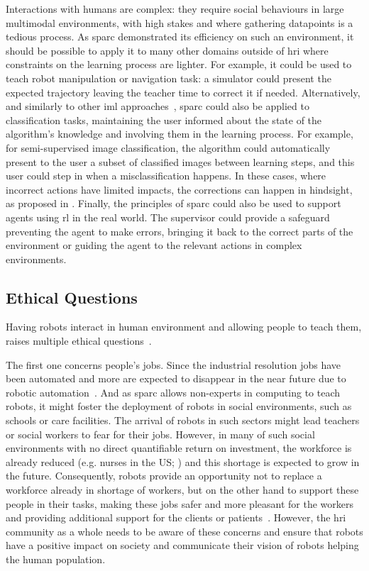 Interactions with humans are complex: they require social behaviours in large multimodal environments, with high stakes and where gathering datapoints is a tedious process. As \gls{sparc} demonstrated its efficiency on such an environment, it should be possible to apply it to many other domains outside of \gls{hri} where constraints on the learning process are lighter. For example, it could be used to teach robot manipulation or navigation task: a simulator could present the expected trajectory leaving the teacher time to correct it if needed. Alternatively, and similarly to other \gls{iml} approaches~\citep{fails2003interactive}, \gls{sparc} could also be applied to classification tasks, maintaining the user informed about the state of the algorithm's knowledge and involving them in the learning process. For example, for semi-supervised image classification, the algorithm could automatically present to the user a subset of classified images between learning steps, and this user could step in when a misclassification happens. In these cases, where incorrect actions have limited impacts, the corrections can happen in hindsight, as proposed in \cite{chernova2009interactive}. Finally, the principles of \gls{sparc} could also be used to support agents using \gls{rl} in the real world. The supervisor could provide a safeguard preventing the agent to make errors, bringing it back to the correct parts of the environment or guiding the agent to the relevant actions in complex environments.

\subsection{Ethical Questions} \label{sec:disc_ethics}
Having robots interact in human environment and allowing people to teach them, raises multiple ethical questions~\citep{lin2014robot}.

The first one concerns people's jobs. Since the industrial resolution jobs have been automated and more are expected to disappear in the near future due to robotic automation~\citep{frey2017future}. And as \gls{sparc} allows non-experts in computing to teach robots, it might foster the deployment of robots in social environments, such as schools or care facilities. The arrival of robots in such sectors might lead teachers or social workers to fear for their jobs. However, in many of such social environments with no direct quantifiable return on investment, the workforce is already reduced (e.g. nurses in the US; \citealt{nevidjon2001nursing}) and this shortage is expected to grow in the future. Consequently, robots provide an opportunity not to replace a workforce already in shortage of workers, but on the other hand to support these people in their tasks, making these jobs safer and more pleasant for the workers and providing additional support for the clients or patients~\citep{wada2005psychological}. However, the \gls{hri} community as a whole needs to be aware of these concerns and ensure that robots have a positive impact on society and communicate their vision of robots helping the human population.

